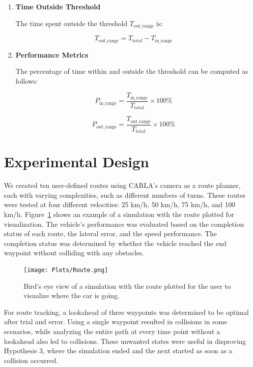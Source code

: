\documentclass[conference]{IEEEtran}
\begin{document}
\begin{enumerate}
    \item \textbf{Time Outside Threshold}

    The time spent outside the threshold $T_{\text{out\_range}}$ is:

    \begin{equation}
    T_{\text{out\_range}} = T_{\text{total}} - T_{\text{in\_range}}
    \end{equation}

    \item \textbf{Performance Metrics}

    The percentage of time within and outside the threshold can be computed as follows:

    \begin{equation}
    P_{\text{in\_range}} = \frac{T_{\text{in\_range}}}{T_{\text{total}}} \times 100\%
    \end{equation}

    \begin{equation}
    P_{\text{out\_range}} = \frac{T_{\text{out\_range}}}{T_{\text{total}}} \times 100\%
    \end{equation}

\end{enumerate}

\section{Experimental Design}

We created ten user-defined routes using CARLA's camera as a route planner, each with varying complexities, such as different numbers of turns. These routes were tested at four different velocities: 25 km/h, 50 km/h, 75 km/h, and 100 km/h. Figure~\ref{fig:route} shows an example of a simulation with the route plotted for visualization. The vehicle's performance was evaluated based on the completion status of each route, the lateral error, and the speed performance. The completion status was determined by whether the vehicle reached the end waypoint without colliding with any obstacles.

\begin{figure}[h]
    \centering
    \texttt{[image: Plots/Route.png]}
    \caption{Bird's eye view of a simulation with the route plotted for the user to visualize where the car is going.}
    \label{fig:route}
\end{figure}

For route tracking, a lookahead of three waypoints was determined to be optimal after trial and error. Using a single waypoint resulted in collisions in some scenarios, while analyzing the entire path at every time point without a lookahead also led to collisions. These unwanted states were useful in disproving Hypothesis 3, where the simulation ended and the next started as soon as a collision occurred.
\end{document}
